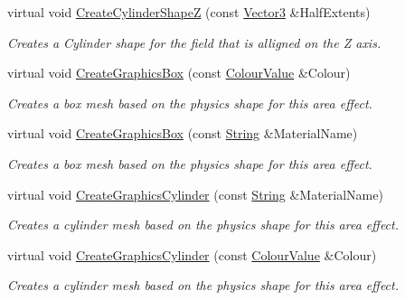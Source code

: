 \begin{DoxyCompactItemize}
virtual void \hyperlink{classphys_1_1AreaEffect_a23fe0cbe64fd47dd70c62df434352eb4}{CreateCylinderShapeZ} (const \hyperlink{classphys_1_1Vector3}{Vector3} \&HalfExtents)
\begin{DoxyCompactList}\small\item\em Creates a Cylinder shape for the field that is alligned on the Z axis. \item\end{DoxyCompactList}\item 
virtual void \hyperlink{classphys_1_1AreaEffect_a12655c60d5461ef6053c8bdd5cc9afea}{CreateGraphicsBox} (const \hyperlink{classphys_1_1ColourValue}{ColourValue} \&Colour)
\begin{DoxyCompactList}\small\item\em Creates a box mesh based on the physics shape for this area effect. \item\end{DoxyCompactList}\item 
virtual void \hyperlink{classphys_1_1AreaEffect_a169a8cba1c9aec84573788dff001fb31}{CreateGraphicsBox} (const \hyperlink{namespacephys_aa03900411993de7fbfec4789bc1d392e}{String} \&MaterialName)
\begin{DoxyCompactList}\small\item\em Creates a box mesh based on the physics shape for this area effect. \item\end{DoxyCompactList}\item 
virtual void \hyperlink{classphys_1_1AreaEffect_a7ace0990c2e9282cfc91847fddeac3e0}{CreateGraphicsCylinder} (const \hyperlink{namespacephys_aa03900411993de7fbfec4789bc1d392e}{String} \&MaterialName)
\begin{DoxyCompactList}\small\item\em Creates a cylinder mesh based on the physics shape for this area effect. \item\end{DoxyCompactList}\item 
virtual void \hyperlink{classphys_1_1AreaEffect_af9a44284ceb691fdd21e4fc01811f04d}{CreateGraphicsCylinder} (const \hyperlink{classphys_1_1ColourValue}{ColourValue} \&Colour)
\begin{DoxyCompactList}\small\item\em Creates a cylinder mesh based on the physics shape for this area effect. \item\end{DoxyCompactList}\item 

\end{DoxyCompactItemize}
